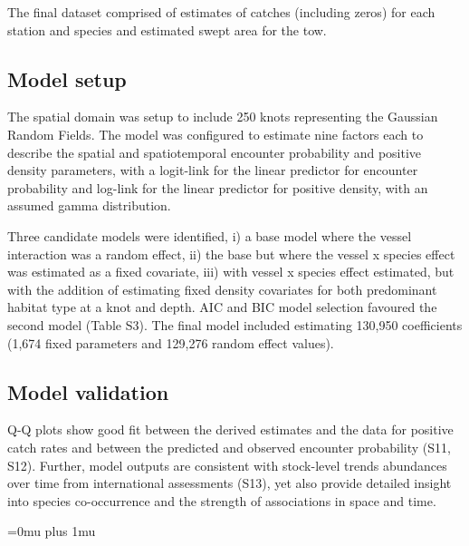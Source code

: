 \documentclass{nature}
\begin{document}
\begin{linenumbers}
The final dataset comprised of estimates of catches (including zeros) for each
station and species and estimated swept area for the tow.

\subsection{Model setup}

The spatial domain was setup to include 250 knots representing the Gaussian
Random Fields. The model was configured to estimate nine factors each to describe
the spatial and spatiotemporal encounter probability and positive density
parameters, with a logit-link for the linear predictor for encounter
probability and log-link for the linear predictor for positive density, with an
assumed gamma distribution.

Three candidate models were identified, i) a base model where the vessel
interaction was a random effect, ii) the base but where the vessel x species
effect was estimated as a fixed covariate, iii) with vessel x species effect
estimated, but with the addition of estimating fixed density covariates for
both predominant habitat type at a knot and depth. AIC and BIC model selection
favoured the second model (Table S3). The final model included estimating
130,950 coefficients (1,674 fixed parameters and 129,276 random effect values).

\subsection{Model validation}

Q-Q plots show good fit between the derived estimates and the data for positive
catch rates and between the predicted and observed encounter probability (S11,
S12).  Further, model outputs are consistent with stock-level trends abundances
over time from international assessments (S13), yet also provide detailed
insight into species co-occurrence and the strength of associations in space
and time. 

\end{linenumbers}
\newpage
\Urlmuskip=0mu plus 1mu\relax

\small{}


\newpage

\end{document}
